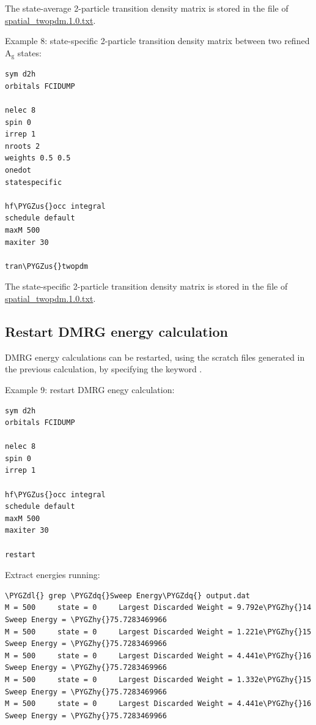 \documentclass[letterpaper,10pt,english]{sphinxmanual}
\def\PYGZus{\char`\_}
\def\PYGZdl{\char`\$}
\def\PYGZhy{\char`\-}
\def\PYGZdq{\char`\"}
\begin{document}
The state-average 2-particle transition density matrix is stored in the file of
\href{https://raw.githubusercontent.com/sanshar/Block/master/README\_Examples/7/spatial\_twopdm.1.0.txt}{spatial\_twopdm.1.0.txt}.

Example 8: state-specific 2-particle transition density matrix between two refined A$_{\text{g}}$ states:

\begin{Verbatim}[commandchars=\\\{\}]
sym d2h
orbitals FCIDUMP

nelec 8
spin 0
irrep 1
nroots 2
weights 0.5 0.5
onedot
statespecific

hf\PYGZus{}occ integral
schedule default
maxM 500
maxiter 30

tran\PYGZus{}twopdm
\end{Verbatim}

The state-specific 2-particle transition density matrix is stored in the file of
\href{https://raw.githubusercontent.com/sanshar/Block/master/README\_Examples/8/spatial\_twopdm.1.0.txt}{spatial\_twopdm.1.0.txt}.


\subsection{Restart DMRG energy calculation}
\label{examples:restart-dmrg-energy-calculation}
DMRG energy calculations can be restarted, using the  scratch files generated in the previous calculation, by specifying the keyword .

Example 9: restart DMRG enegy calculation:

\begin{Verbatim}[commandchars=\\\{\}]
sym d2h
orbitals FCIDUMP

nelec 8
spin 0
irrep 1

hf\PYGZus{}occ integral
schedule default
maxM 500
maxiter 30

restart
\end{Verbatim}

Extract energies running:

\begin{Verbatim}[commandchars=\\\{\}]
\PYGZdl{} grep \PYGZdq{}Sweep Energy\PYGZdq{} output.dat
M = 500     state = 0     Largest Discarded Weight = 9.792e\PYGZhy{}14  Sweep Energy = \PYGZhy{}75.7283469966
M = 500     state = 0     Largest Discarded Weight = 1.221e\PYGZhy{}15  Sweep Energy = \PYGZhy{}75.7283469966
M = 500     state = 0     Largest Discarded Weight = 4.441e\PYGZhy{}16  Sweep Energy = \PYGZhy{}75.7283469966
M = 500     state = 0     Largest Discarded Weight = 1.332e\PYGZhy{}15  Sweep Energy = \PYGZhy{}75.7283469966
M = 500     state = 0     Largest Discarded Weight = 4.441e\PYGZhy{}16  Sweep Energy = \PYGZhy{}75.7283469966
\end{Verbatim}
\end{document}
